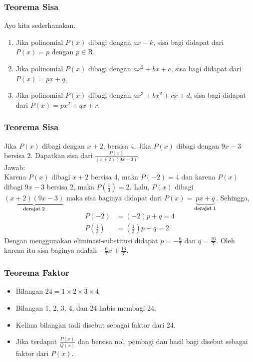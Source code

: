 \documentclass[11pt]{beamer}
\begin{document}
	\begin{frame}
		\frametitle{Teorema Sisa}
		Ayo kita sederhanakan.
		\begin{enumerate}
			\item Jika polinomial $P(x)$ dibagi dengan $ax-k$, sisa bagi didapat dari $P(x)=p$ dengan $p\in \mathrm{R}$.
			\item Jika polinomial $P(x)$ dibagi dengan $ax^2+bx+c$, sisa bagi didapat dari $P(x)=px+q$.
			\item Jika polinomial $P(x)$ dibagi dengan $ax^3+bx^2+cx+d$, sisa bagi didapat dari $P(x)=px^2+qx+r$. 
		\end{enumerate}
	\end{frame}	
		
	\begin{frame}
		\frametitle{Teorema Sisa}
		Jika $P(x)$ dibagi dengan $x+2$, bersisa 4. Jika $P(x)$ dibagi dengan $9x-3$ bersisa 2. Dapatkan sisa dari $\frac{P(x)}{(x+2)(9x-3)}$.\\
		Jawab:\\
		Karena $P(x)$ dibagi $x+2$ bersisa 4, maka $P(-2)=4$ dan karena $P(x)$ dibagi $9x-3$ bersisa 2, maka $P\left(\frac{1}{3}\right)=2$. Lalu, $P(x)$ dibagi $\underbrace{(x+2)(9x-3)}_{\textbf{derajat 2}}$ maka sisa baginya didapat dari $P(x)=\underbrace{px+q}_{\textbf{derajat 1}}$. Sehingga,
		\begin{align*}
			P(-2)&=(-2)p+q=4\\
			P\left(\frac{1}{3}\right)&=\left(\frac{1}{3}\right)p+q=2
		\end{align*}
		 Dengan menggunakan eliminasi-substitusi didapat $p=-\frac{6}{7}$ dan $q=\frac{16}{7}$. Oleh karena itu sisa baginya adalah $-\frac{6}{7}x+\frac{16}{7}.$ 
				
	\end{frame}
		
	\begin{frame}
		\frametitle{Teorema Faktor}
		\begin{itemize}
			\item Bilangan $24=1\times 2\times 3\times 4$
			\item Bilangan 1, 2, 3, 4, dan 24 habis membagi 24.
			\item Kelima bilangan tadi disebut sebagai faktor dari 24.
			\item Jika terdapat $\frac{P(x)}{Q(x)}$ dan bersisa nol, pembagi dan hasil bagi disebut sebagai faktor dari $P(x)$.
		\end{itemize}
	\end{frame}
	
\end{document}
